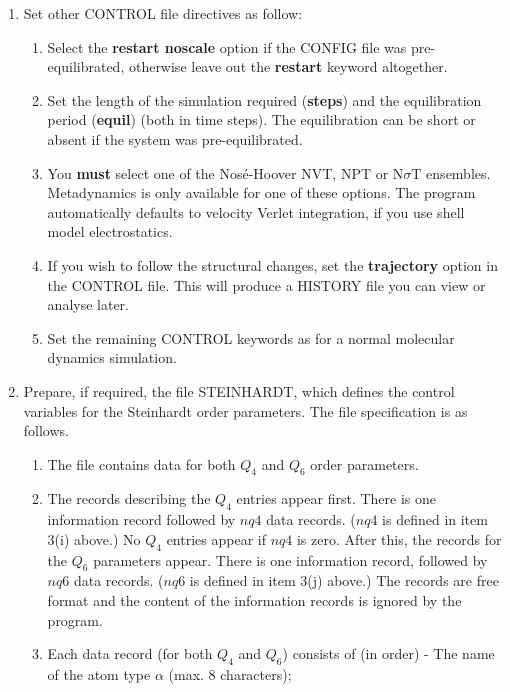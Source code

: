 \begin{enumerate}
\begin{enumerate}
  {\bf wt\_Dt} $f$ \newline where $f$ is a real number.
\end{enumerate}
\item Set other CONTROL file directives as follow:
\begin{enumerate}
\item Select the {\bf restart noscale} option if the CONFIG file was
      pre-equilibrated, otherwise leave out the {\bf restart} keyword 
      altogether.
\item Set the length of the simulation required ({\bf steps}) and the 
      equilibration period ({\bf equil}) (both in time steps). The
      equilibration can be short or absent if the system was pre-equilibrated.
\item You {\bf must} select one of the Nos\'{e}-Hoover NVT, NPT or
      N$\sigma$T ensembles.  Metadynamics is only available for one of these
      options. The program automatically defaults to velocity Verlet 
      integration, if you use shell model electrostatics.
\item If you wish to follow the structural changes, set the {\bf
      trajectory} option in the CONTROL file. This will produce a HISTORY file
      you can view or analyse later.
\item Set the remaining CONTROL keywords as for a normal molecular dynamics
  simulation. 
\end{enumerate}
\item Prepare, if required, the file STEINHARDT, which defines the 
  control variables for the Steinhardt order parameters. The file 
  specification is as follows.  
\begin{enumerate}
\item The file contains data for both  $Q_{4}$ and $Q_{6}$ order 
  parameters. 
\item The records describing the $Q_{4}$ entries appear first. There is 
  one information record followed by $nq4$ data records. ($nq4$ is defined in
  item 3(i) above.) No $Q_{4}$ entries appear if $nq4$ is zero. After this, 
  the records for the  $Q_{6}$ parameters appear.  There is one information 
  record, followed by $nq6$ data records. ($nq6$ is defined in item
  3(j) above.) The records are free format and the content of
  the information records is ignored by the program.
\item Each data record (for both $Q_{4}$ and $Q_{6}$) consists of 
  (in order)\newline
  - The name of the atom type $\alpha$ (max. 8 characters); \newline

\end{enumerate}
\end{enumerate}

